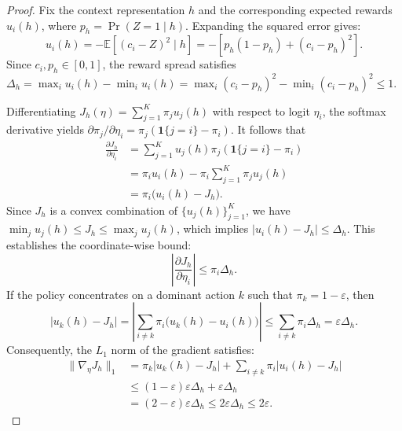 \documentclass{article} %
\begin{document}
\begin{proof}
Fix the context representation $h$ and the corresponding expected rewards $u_i(h)$, where $p_h = \Pr(Z = 1 \mid h)$.
Expanding the squared error gives:
\begin{equation}
    u_i(h) = -\mathbb E[(c_i - Z)^2 \mid h] = -\left[ p_h(1 - p_h) + (c_i - p_h)^2 \right].
\end{equation}
Since $c_i, p_h \in [0, 1]$, the reward spread satisfies $\Delta_h = \max_i u_i(h) - \min_i u_i(h) = \max_i (c_i - p_h)^2 - \min_i (c_i - p_h)^2 \le 1$.

Differentiating $J_h(\eta) = \sum_{j=1}^K \pi_j u_j(h)$ with respect to logit $\eta_i$, the softmax derivative yields $\partial \pi_j / \partial \eta_i = \pi_j (\mathbf 1\{j = i\} - \pi_i)$.
It follows that
\begin{align}
    \frac{\partial J_h}{\partial\eta_i}
    &= \sum_{j=1}^K u_j(h) \pi_j (\mathbf 1\{j = i\} - \pi_i) \\
    &= \pi_i u_i(h) - \pi_i \sum_{j=1}^K \pi_j u_j(h) \\
    &= \pi_i \bigl(u_i(h) - J_h\bigr).
\end{align}
Since $J_h$ is a convex combination of $\{u_j(h)\}_{j=1}^K$, we have $\min_j u_j(h) \le J_h \le \max_j u_j(h)$, which implies $|u_i(h) - J_h| \le \Delta_h$.
This establishes the coordinate-wise bound:
\begin{equation}
    \left|\frac{\partial J_h}{\partial\eta_i}\right| \le \pi_i \Delta_h.
\end{equation}
If the policy concentrates on a dominant action $k$ such that $\pi_k = 1 - \varepsilon$, then
\begin{equation}
    |u_k(h) - J_h| = \left| \sum_{i \ne k} \pi_i \bigl(u_k(h) - u_i(h)\bigr) \right| \le \sum_{i \ne k} \pi_i \Delta_h = \varepsilon \Delta_h.
\end{equation}
Consequently, the $L_1$ norm of the gradient satisfies:
\begin{align}
    \|\nabla_\eta J_h\|_1
    &= \pi_k |u_k(h) - J_h| + \sum_{i \ne k} \pi_i |u_i(h) - J_h| \\
    &\le (1 - \varepsilon)\varepsilon \Delta_h + \varepsilon \Delta_h \\
    &= (2 - \varepsilon)\varepsilon \Delta_h \le 2\varepsilon \Delta_h \le 2\varepsilon.
\end{align}
\end{proof}
\end{document}
